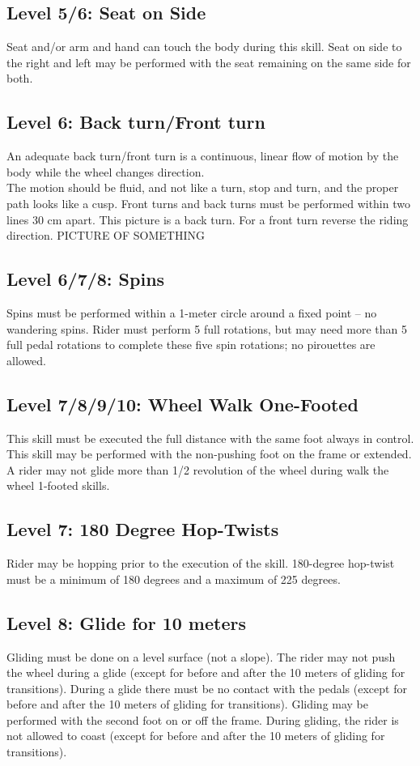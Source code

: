 \subsection{Level 5/6: Seat on Side}
Seat and/or arm and hand can touch the body during this skill. Seat on side to the right and left may be performed with
the seat remaining on the same side for both.
\subsection{Level 6: Back turn/Front turn}
An adequate back turn/front turn is a continuous, linear flow of motion by the body while the wheel changes direction. \\
The motion should be fluid, and not like a turn, stop and turn, and the proper path looks like a cusp. Front turns and
back turns must be performed within two lines 30 cm apart. This picture is a back turn. For a front turn reverse the
riding direction.
PICTURE OF SOMETHING
\subsection{Level 6/7/8: Spins}
Spins must be performed within a 1-meter circle around a fixed point – no wandering spins. Rider must perform 5 full
rotations, but may need more than 5 full pedal rotations to complete these five spin rotations; no pirouettes are allowed.
\subsection{Level 7/8/9/10: Wheel Walk One-Footed}
This skill must be executed the full distance with the same foot always in control. This skill may be performed with the
non-pushing foot on the frame or extended. A rider may not glide more than 1/2 revolution of the wheel during walk the
wheel 1-footed skills.
\subsection{Level 7: 180 Degree Hop-Twists}
Rider may be hopping prior to the execution of the skill. 180-degree hop-twist must be a minimum of 180 degrees and
a maximum of 225 degrees.
\subsection{Level 8: Glide for 10 meters}
Gliding must be done on a level surface (not a slope). The rider may not push the wheel during a glide (except for
before and after the 10 meters of gliding for transitions). During a glide there must be no contact with the pedals
(except for before and after the 10 meters of gliding for transitions). Gliding may be performed with the second foot on
or off the frame. During gliding, the rider is not allowed to coast (except for before and after the 10 meters of gliding
for transitions).
